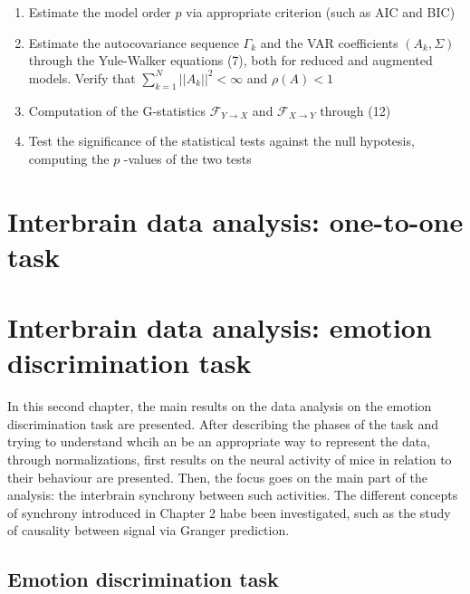 \documentclass[a4paper]{article}
\begin{document}
\begin{enumerate}
	\item Estimate the model order $p$ via appropriate criterion (such as AIC and BIC)
	
	\item Estimate the autocovariance sequence $\Gamma_k$ and the VAR coefficients $(A_k, \Sigma)$ through the Yule-Walker equations (7), both for reduced and augmented models. Verify that $ \sum_{k=1}^{N}||A_k||^2 < \infty $ and  $\rho(A) < 1$
	
	\item Computation of the G-statistics $ \mathcal{F}_{Y \rightarrow X} $ and $ \mathcal{F}_{X \rightarrow Y} $ through (12)
	
	\item Test the significance of the statistical tests against the null hypotesis, computing the $p$ -values of the two tests 
	
\end{enumerate}

\newpage
\section{Interbrain data analysis: one-to-one task}





\newpage
\section{Interbrain data analysis: emotion discrimination task}

In this second chapter, the main results on the data analysis on the emotion discrimination task are presented. After describing the phases of the task and trying to understand whcih an be an appropriate way  to represent the data, through normalizations, first results on the neural activity of mice in relation to their behaviour are presented. Then, the focus goes on the main part of the analysis: the interbrain synchrony between such activities. The different concepts of synchrony introduced in Chapter 2 habe been investigated, such as the study of causality between signal via Granger prediction. 


\subsection{Emotion discrimination task}
\end{document}
